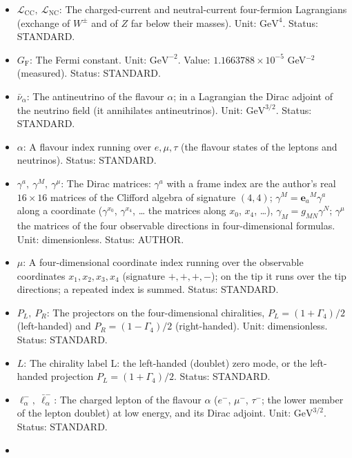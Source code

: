 \documentclass[
  10pt,
]{article}
\providecommand{\tightlist}{%
  \setlength{\itemsep}{0pt}\setlength{\parskip}{0pt}}
\begin{document}
\begin{itemize}
\tightlist
\item
  \(\mathcal{L}_{\mathrm{CC}},\ \mathcal{L}_{\mathrm{NC}}\): The
  charged-current and neutral-current four-fermion Lagrangians (exchange
  of \(W^\pm\) and of \(Z\) far below their masses). Unit:
  \(\mathrm{GeV}^{4}\). Status: STANDARD.
\item
  \(G_{\mathrm{F}}\): The Fermi constant. Unit: \(\mathrm{GeV}^{-2}\).
  Value: \(1.1663788\times10^{-5}\) GeV\(^{-2}\) (measured). Status:
  STANDARD.
\item
  \(\bar\nu_\alpha\): The antineutrino of the flavour \(\alpha\); in a
  Lagrangian the Dirac adjoint of the neutrino field (it annihilates
  antineutrinos). Unit: \(\mathrm{GeV}^{3/2}\). Status: STANDARD.
\item
  \(\alpha\): A flavour index running over \(e, \mu, \tau\) (the flavour
  states of the leptons and neutrinos). Status: STANDARD.
\item
  \(\gamma^a,\ \gamma^M,\ \gamma^\mu\): The Dirac matrices: \(\gamma^a\)
  with a frame index are the author's real \(16 \times 16\) matrices of
  the Clifford algebra of signature \((4, 4)\);
  \(\gamma^M = \mathbf{e}_a{}^M\gamma^a\) along a coordinate
  (\(\gamma^{x_0}\), \(\gamma^{x_4}\), \ldots{} the matrices along
  \(x_0\), \(x_4\), \ldots), \(\gamma_M = g_{MN}\gamma^N\);
  \(\gamma^\mu\) the matrices of the four observable directions in
  four-dimensional formulas. Unit: dimensionless. Status: AUTHOR.
\item
  \(\mu\): A four-dimensional coordinate index running over the
  observable coordinates \(x_1, x_2, x_3, x_4\) (signature \(+,+,+,-\));
  on the tip it runs over the tip directions; a repeated index is
  summed. Status: STANDARD.
\item
  \(P_L,\ P_R\): The projectors on the four-dimensional chiralities,
  \(P_L = (1 + \Gamma_4)/2\) (left-handed) and
  \(P_R = (1 - \Gamma_4)/2\) (right-handed). Unit: dimensionless.
  Status: STANDARD.
\item
  \(L\): The chirality label L: the left-handed (doublet) zero mode, or
  the left-handed projection \(P_L = (1 + \Gamma_4)/2\). Status:
  STANDARD.
\item
  \(\ell^-_\alpha,\ \bar\ell^-_\alpha\): The charged lepton of the
  flavour \(\alpha\) (\(e^-\), \(\mu^-\), \(\tau^-\); the lower member
  of the lepton doublet) at low energy, and its Dirac adjoint. Unit:
  \(\mathrm{GeV}^{3/2}\). Status: STANDARD.
\item

\end{itemize}
\end{document}
